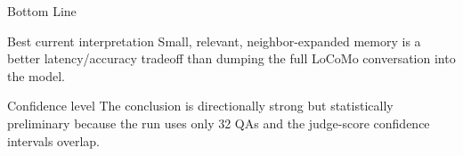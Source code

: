 \documentclass[aspectratio=169]{beamer}
\begin{document}
\begin{frame}{Bottom Line}
\begin{block}{Best current interpretation}
Small, relevant, neighbor-expanded memory is a better latency/accuracy tradeoff than dumping the full LoCoMo conversation into the model.
\end{block}

\begin{block}{Confidence level}
The conclusion is directionally strong but statistically preliminary because the run uses only 32 QAs and the judge-score confidence intervals overlap.
\end{block}
\end{frame}
\end{document}
